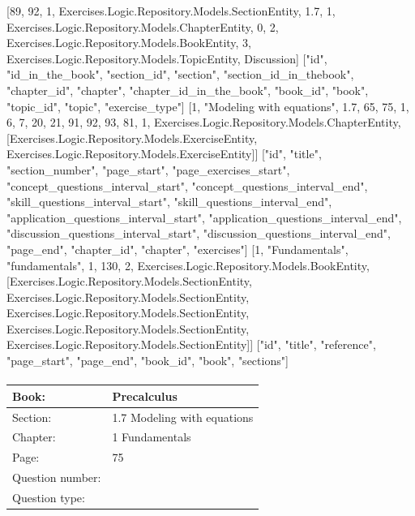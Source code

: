 \documentclass{article}
\begin{document}
    [89, 92, 1, Exercises.Logic.Repository.Models.SectionEntity, 1.7, 1, Exercises.Logic.Repository.Models.ChapterEntity, 0, 2, Exercises.Logic.Repository.Models.BookEntity, 3, Exercises.Logic.Repository.Models.TopicEntity, Discussion]
    ["id", "id_in_the_book", "section_id", "section", "section_id_in_thebook", "chapter_id", "chapter", "chapter_id_in_the_book", "book_id", "book", "topic_id", "topic", "exercise_type"]
    [1, "Modeling with equations", 1.7, 65, 75, 1, 6, 7, 20, 21, 91, 92, 93, 81, 1, Exercises.Logic.Repository.Models.ChapterEntity, [Exercises.Logic.Repository.Models.ExerciseEntity, Exercises.Logic.Repository.Models.ExerciseEntity]]
    ["id", "title", "section_number", "page_start", "page_exercises_start", "concept_questions_interval_start", "concept_questions_interval_end", "skill_questions_interval_start", "skill_questions_interval_end", "application_questions_interval_start", "application_questions_interval_end", "discussion_questions_interval_start", "discussion_questions_interval_end", "page_end", "chapter_id", "chapter", "exercises"]
    [1, "Fundamentals", "fundamentals", 1, 130, 2, Exercises.Logic.Repository.Models.BookEntity, [Exercises.Logic.Repository.Models.SectionEntity, Exercises.Logic.Repository.Models.SectionEntity, Exercises.Logic.Repository.Models.SectionEntity, Exercises.Logic.Repository.Models.SectionEntity, Exercises.Logic.Repository.Models.SectionEntity]]
    ["id", "title", "reference", "page_start", "page_end", "book_id", "book", "sections"]

   \paragraph{}
   \begin{tabularx}{1\textwidth}{
           p{}
           p{}
       }
       \toprule
       Book: & Precalculus
       \\
       \midrule
       Section: & 1.7 Modeling with equations
       \\
       \midrule
       Chapter: & 1 Fundamentals
       \\
       \midrule
       Page: & 75
       \\
       \midrule
       Question number: & 
       \\
       \midrule
       Question type: & 
       \\
       \bottomrule
   \end{tabularx}
\end{document}
